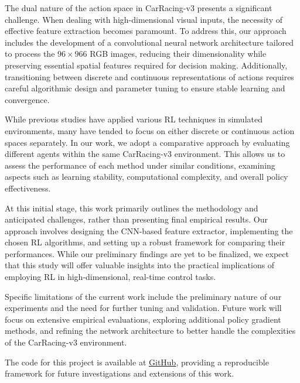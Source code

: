\documentclass[../CSC_52081_EP.tex]{subfiles}
\begin{document}
The dual nature of the action space in CarRacing-v3 presents a significant challenge. When dealing with high-dimensional visual inputs, the necessity of effective feature extraction becomes paramount. To address this, our approach includes the development of a convolutional neural network architecture tailored to process the \(96\times96\)6 RGB images, reducing their dimensionality while preserving essential spatial features required for decision making. Additionally, transitioning between discrete and continuous representations of actions requires careful algorithmic design and parameter tuning to ensure stable learning and convergence.

While previous studies have applied various RL techniques in simulated environments, many have tended to focus on either discrete or continuous action spaces separately. In our work, we adopt a comparative approach by evaluating different agents within the same CarRacing-v3 environment. This allows us to assess the performance of each method under similar conditions, examining aspects such as learning stability, computational complexity, and overall policy effectiveness.

At this initial stage, this work primarily outlines the methodology and anticipated challenges, rather than presenting final empirical results. Our approach involves designing the CNN-based feature extractor, implementing the chosen RL algorithms, and setting up a robust framework for comparing their performances. While our preliminary findings are yet to be finalized, we expect that this study will offer valuable insights into the practical implications of employing RL in high-dimensional, real-time control tasks.

Specific limitations of the current work include the preliminary nature of our experiments and the need for further tuning and validation. Future work will focus on extensive empirical evaluations, exploring additional policy gradient methods, and refining the network architecture to better handle the complexities of the CarRacing-v3 environment.

The code for this project is available at \href{https://github.com/tr0fin0/ensta_CSC_52081_EP_project}{GitHub}, providing a reproducible framework for future investigations and extensions of this work.
\end{document}
